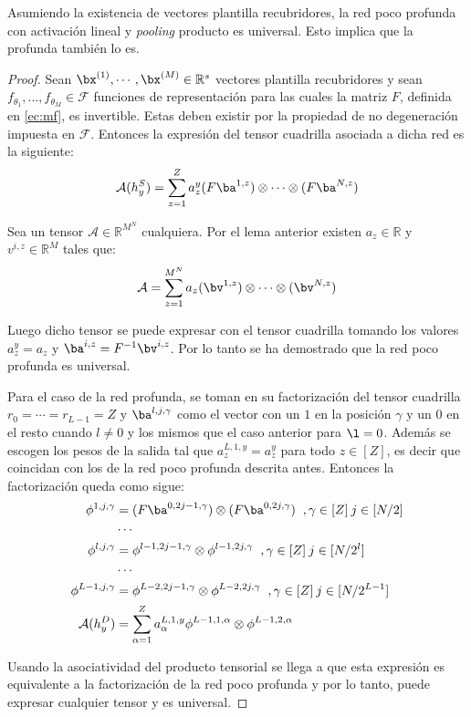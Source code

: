 \begin{prop}
Asumiendo la existencia de vectores plantilla recubridores, la red poco profunda con activación lineal y \textit{pooling} producto es universal. Esto implica que la profunda también lo es.
\end{prop}
\begin{proof}
Sean $\bx^{(1)},\cdots ,\bx^{(M)}\in\mathbb{R}^s$ vectores plantilla recubridores y sean $f_{\theta_1},... ,f_{\theta_M}\in\mathcal{F}$ funciones de representación para las cuales la matriz $F$, definida en \eqref{ec:mf}, es invertible. Estas deben existir por la propiedad de no degeneración impuesta en $\mathcal{F}$. Entonces la expresión del tensor cuadrilla asociada a dicha red es la siguiente:
\begin{align*}
\mathcal{A}(h_y^S)=\sum_{z=1}^{Z}a^y_z(F\ba^{1,z})\otimes\cdots \otimes(F\ba^{N,z})
\end{align*}

Sea un tensor $\mathcal{A}\in\mathbb{R}^{M^{N}}$ cualquiera. Por el lema anterior existen $a_z\in\mathbb{R}$ y $v^{i,z}\in\mathbb{R}^M$ tales que:
\begin{align*}
\mathcal{A}=\sum_{z=1}^{M^N}a_z(\bv^{1,z})\otimes\cdots \otimes(\bv^{N,z})
\end{align*}

Luego dicho tensor se puede expresar con el tensor cuadrilla tomando los valores $a^y_z = a_z$ y  $\ba^{i,z} = F^{-1}\bv^{i,z}$. Por lo tanto se ha demostrado que la red poco profunda es universal.

Para el caso de la red profunda, se toman en su factorización del tensor cuadrilla $r_0 = \cdots  = r_{L-1} = Z$ y $\ba^{l,j,\gamma}$ como el vector con un $1$ en la posición $\gamma$ y un $0$ en el resto cuando $l\neq 0$ y los mismos que el caso anterior para $\l = 0$. Además se escogen los pesos de la salida tal que $a_z^{L,1,y} = a_z^y $ para todo $z\in[Z]$, es decir que coincidan con los de la red poco profunda descrita antes.  Entonces la factorización queda como sigue:
\begin{align*}
\begin{aligned}
\phi^{1,j,\gamma} &= (F\ba^{0,2j-1,\gamma})\otimes(F\ba^{0,2j,\gamma}) \;\; ,\gamma \in [Z] \:  j \in [N/2] \\
&\cdots  \\
\phi^{l,j,\gamma} &= \phi^{l-1,2j-1,\gamma}\otimes\phi^{l-1,2j,\gamma} \;\; ,\gamma \in [Z] \: j \in [N/2^l] \\
&\cdots  \\
\phi^{L-1,j,\gamma} &= \phi^{L-2,2j-1,\gamma}\otimes\phi^{L-2,2j,\gamma} \;\; ,\gamma \in [Z] \: j \in [N/2^{L-1}] \\
\mathcal{A}(h_y^D) &= \sum^{Z}_{\alpha=1}a_\alpha^{L,1,y}\phi^{L-1,1,\alpha}\otimes\phi^{L-1,2,\alpha}\\
\end{aligned}
\end{align*}

Usando la asociatividad del producto tensorial se llega a que esta expresión es equivalente a la factorización de la red poco profunda y por lo tanto, puede expresar cualquier tensor y es universal.

\end{proof}

